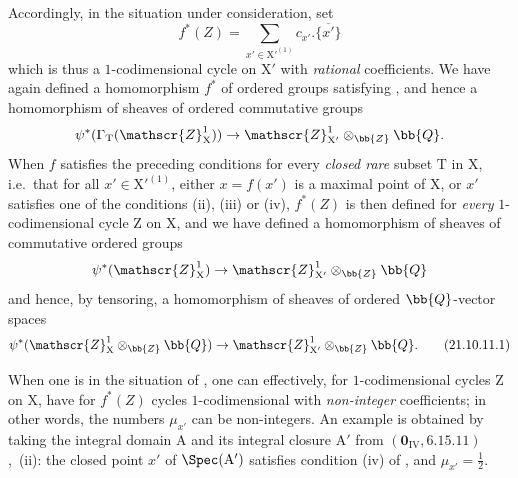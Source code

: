 \begin{env}[21.10.11]
Accordingly, in the situation under consideration, set
\[
  f^*(Z)=\sum_{x'\in\mathrm{X}'^{(1)}} c_{x'}.\overline{\{x'\}}
\]
which is thus a $1$-codimensional cycle on $\mathrm{X}'$ with \emph{rational} coefficients.
We have again defined a homomorphism $f^*$ of ordered groups satisfying , and hence a homomorphism of sheaves of ordered commutative groups
\[
  \psi^*(\Gamma_{\mathrm{T}}(\mathscr{Z}^1_{\mathrm{X}}))\to\mathscr{Z}^1_{\mathrm{X}'}\otimes_{\bb{Z}}\bb{Q}.
\]
When $f$ satisfies the preceding conditions for every \emph{closed rare} subset $\mathrm{T}$ in $\mathrm{X}$, i.e.\ that for all $x'\in\mathrm{X}'^{(1)}$, either $x=f(x')$ is a maximal point of $\mathrm{X}$, or $x'$ satisfies one of the conditions (ii), (iii) or (iv), $f^*(Z)$ is then defined for \emph{every} $1$-codimensional cycle $\mathrm{Z}$ on $\mathrm{X}$, and we have defined a homomorphism of sheaves of commutative ordered groups
\[
  \psi^*(\mathscr{Z}^1_{\mathrm{X}})\to\mathscr{Z}^1_{\mathrm{X}'}\otimes_{\bb{Z}}\bb{Q}
\]
and hence, by tensoring, a homomorphism of sheaves of ordered $\bb{Q}$-vector spaces
\[
\label{IV.21.10.11.1}
  \psi^*(\mathscr{Z}^1_{\mathrm{X}}\otimes_{\bb{Z}}\bb{Q})\to\mathscr{Z}^1_{\mathrm{X}'}\otimes_{\bb{Z}}\bb{Q}.
  \tag{21.10.11.1}
\]
\end{env}

\begin{remark}[21.10.12]
\label{IV.21.10.12}
When one is in the situation of , one can effectively, for $1$-codimensional cycles $\mathrm{Z}$ on $\mathrm{X}$, have for $f^*(Z)$ cycles $1$-codimensional with \emph{non-integer} coefficients; in other words, the numbers $\mu_{x'}$ can be non-integers.
An example is obtained by taking the integral domain $\mathrm{A}$ and its integral closure $\mathrm{A}'$ from $(\mathbf{0}_{\mathrm{IV}},6.15.11)$,~(ii): the closed point $x'$ of $\Spec(\mathrm{A}')$ satisfies condition (iv) of , and $\mu_{x'}=\frac12$.
\end{remark}

